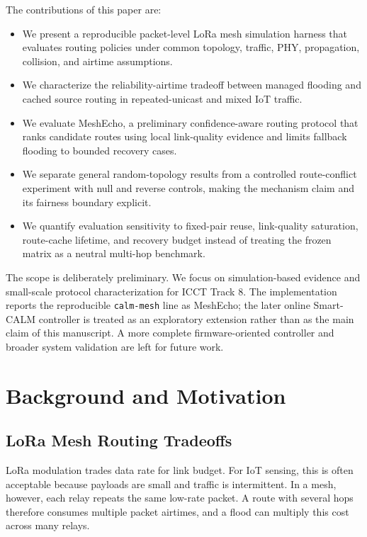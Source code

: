 \documentclass[conference]{IEEEtran}
\begin{document}
The contributions of this paper are:
\begin{itemize}
    \item We present a reproducible packet-level LoRa mesh simulation harness
    that evaluates routing policies under common topology, traffic, PHY,
    propagation, collision, and airtime assumptions.
    \item We characterize the reliability-airtime tradeoff between managed
    flooding and cached source routing in repeated-unicast and mixed IoT traffic.
    \item We evaluate MeshEcho, a preliminary confidence-aware routing
    protocol that ranks candidate routes using local link-quality evidence and
    limits fallback flooding to bounded recovery cases.
    \item We separate general random-topology results from a controlled
    route-conflict experiment with null and reverse controls, making the
    mechanism claim and its fairness boundary explicit.
    \item We quantify evaluation sensitivity to fixed-pair reuse, link-quality
    saturation, route-cache lifetime, and recovery budget instead of treating
    the frozen matrix as a neutral multi-hop benchmark.
\end{itemize}

The scope is deliberately preliminary. We focus on simulation-based evidence and
small-scale protocol characterization for ICCT Track 8. The implementation
reports the reproducible \texttt{calm-mesh} line as MeshEcho; the later online
Smart-CALM controller is treated as an exploratory extension rather than as the
main claim of this manuscript. A more complete firmware-oriented controller and
broader system validation are left for future work.

\section{Background and Motivation}

\subsection{LoRa Mesh Routing Tradeoffs}

LoRa modulation trades data rate for link budget. For IoT sensing, this is often
acceptable because payloads are small and traffic is intermittent. In a mesh,
however, each relay repeats the same low-rate packet. A route with several hops
therefore consumes multiple packet airtimes, and a flood can multiply this cost
across many relays.
\end{document}
